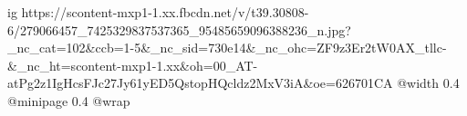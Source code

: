  
 
 
 
 

\ifcmt
  ig https://scontent-mxp1-1.xx.fbcdn.net/v/t39.30808-6/279066457_7425329837537365_95485659096388236_n.jpg?_nc_cat=102&ccb=1-5&_nc_sid=730e14&_nc_ohc=ZF9z3Er2tW0AX_tllc-&_nc_ht=scontent-mxp1-1.xx&oh=00_AT-atPg2z1IgHcsFJc27Jy61yED5QstopHQcldz2MxV3iA&oe=626701CA
  @width 0.4
  @minipage 0.4
  @wrap \parpic[r]
\fi
